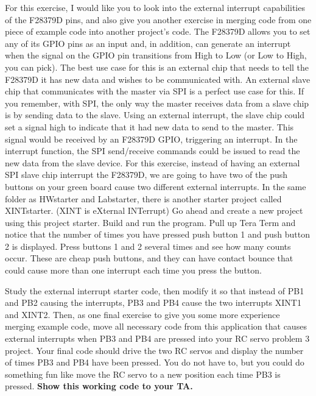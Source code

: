\documentclass[11pt]{article}
\begin{document}
\Ex[Interrupts]

For this exercise, I would like you to look into the external interrupt capabilities of the F28379D pins, and also give you another exercise in merging code from one piece of example code into another project’s code. The F28379D allows you to set any of its GPIO pins as an input and, in addition, can generate an interrupt when the signal on the GPIO pin transitions from High to Low (or Low to High, you can pick). The best use case for this is an external chip that needs to tell the F28379D it has new data and wishes to be communicated with. An external slave chip that communicates with the master via SPI is a perfect use case for this. If you remember, with SPI, the only way the master receives data from a slave chip is by sending data to the slave. Using an external interrupt, the slave chip could set a signal high to indicate that it had new data to send to the master. This signal would be received by an F28379D GPIO, triggering an interrupt. In the interrupt function, the SPI send/receive commands could be issued to read the new data from the slave device. For this exercise, instead of having an external SPI slave chip interrupt the F28379D, we are going to have two of the push buttons on your green board cause two different external interrupts. In the same folder as HWstarter and Labstarter, there is another starter project called XINTstarter. (XINT is eXternal INTerrupt)  Go ahead and create a new project using this project starter. Build and run the program. Pull up Tera Term and notice that the number of times you have pressed push button 1 and push button 2 is displayed. Press buttons 1 and 2 several times and see how many counts occur. These are cheap push buttons, and they can have contact bounce that could cause more than one interrupt each time you press the button.

Study the external interrupt starter code, then modify it so that instead of PB1 and PB2 causing the interrupts, PB3 and PB4 cause the two interrupts XINT1 and XINT2. Then, as one final exercise to give you some more experience merging example code, move all necessary code from this application that causes external interrupts when PB3 and PB4 are pressed into your RC servo problem 3 project. Your final code should drive the two RC servos and display the number of times PB3 and PB4 have been pressed. You do not have to, but you could do something fun like move the RC servo to a new position each time PB3 is pressed. \textbf{Show this working code to your TA.}
\end{document}
